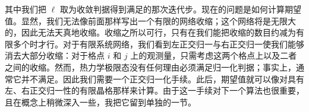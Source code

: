 其中我们把 $\ell$ 取为收敛判据得到满足的那次迭代步。现在的问题是如何计算期望值。显然，我们无法像前面那样写出一个有限的网络收缩；这个网络将是无限大的，因此无法天真地收缩。收缩之所以可行，只有在我们能把收缩的数目约减为有限多个时才行。对于有限系统网络，我们看到左正交归一与右正交归一使我们能够消去大部分收缩：对于格点 $i$ 和 $j$ 上的观测量，只需考虑这两个格点上以及二者之间的收缩。然而，热力学极限态没有任何理由必须满足归一化判据；事实上，通常它并不满足。因此我们需要一个正交归一化手续。此后，期望值就可以像对具有左、右正交归一性的有限晶格那样来计算。由于这一手续对下一个算法也很重要，且在概念上稍微深入一些，我把它留到单独的一节。 

